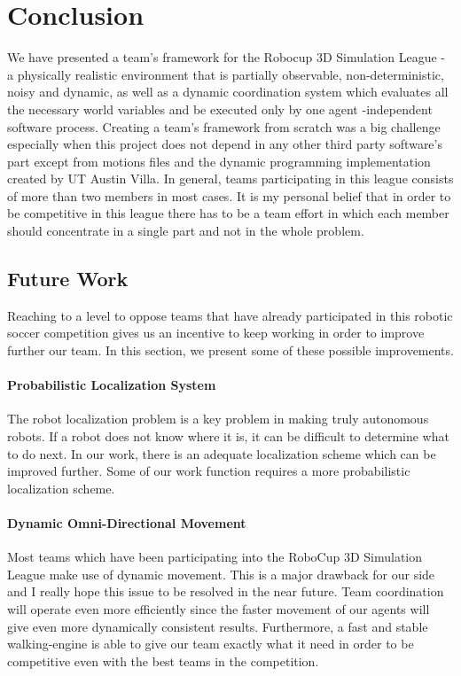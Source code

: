 \chapter{Conclusion}
\label{conclusion}

We have presented a team's framework for the Robocup 3D Simulation League - a physically realistic environment that is partially observable, non-deterministic, noisy and dynamic, as well as a dynamic coordination system which evaluates all the necessary world variables and be executed only by one agent -independent software process. Creating a team's framework from scratch was a big challenge especially when this project does not depend in any other third party software's part except from motions files and the dynamic programming implementation created by UT Austin Villa. In general, teams participating in this league consists of more than two members in most cases. It is my personal belief that in order to be competitive in this league there has to be a team effort in which each member should concentrate in a single part and not in the whole problem.

\section{Future Work}
Reaching to a level to oppose teams that have already participated in this robotic soccer competition gives us an incentive to keep working in order to improve further our team. In this section, we present some of these possible improvements.  


\subsubsection*{Probabilistic Localization System}
The robot localization problem is a key problem in making truly autonomous robots. If a robot does not know where it is, it can be difficult to determine what to do next. In our work, there is an adequate localization scheme which can be improved further. Some of our work function requires a more probabilistic localization scheme.


\subsubsection*{Dynamic Omni-Directional Movement}
Most teams which have been participating into the RoboCup 3D Simulation League make use of dynamic movement. This is a major drawback for our side and I really hope this issue to be resolved in the near future. Team coordination will operate even more efficiently since the faster movement of our agents will give even more dynamically consistent results. Furthermore, a fast and stable walking-engine is able to give our team exactly what it need in order to be competitive even with the best teams in the competition.


